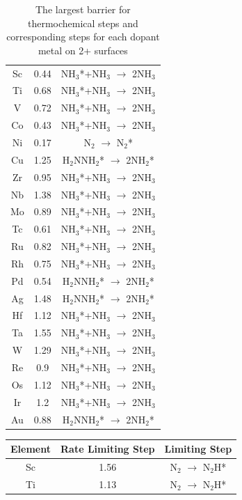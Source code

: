\documentclass[journal=jacsat,manuscript=article]{achemso}
\begin{document}
\begin{table}
\begin{center}
\begin{tabular}{| c | c |c |}
\hline
Sc & 0.44 & NH$_3$*+NH$_3$ $\rightarrow$ 2NH$_3$\\
Ti & 0.68 & NH$_3$*+NH$_3$ $\rightarrow$ 2NH$_3$\\
V & 0.72 & NH$_3$*+NH$_3$ $\rightarrow$ 2NH$_3$\\
Co & 0.43 & NH$_3$*+NH$_3$ $\rightarrow$ 2NH$_3$\\
Ni & 0.17 & N$_2$ $\rightarrow$ N$_2$*\\
Cu & 1.25 & H$_2$NNH$_2$* $\rightarrow$ 2NH$_2$*\\
Zr & 0.95 & NH$_3$*+NH$_3$ $\rightarrow$ 2NH$_3$\\
Nb & 1.38 & NH$_3$*+NH$_3$ $\rightarrow$ 2NH$_3$\\
Mo & 0.89 & NH$_3$*+NH$_3$ $\rightarrow$ 2NH$_3$\\
Tc & 0.61 & NH$_3$*+NH$_3$ $\rightarrow$ 2NH$_3$\\
Ru & 0.82 & NH$_3$*+NH$_3$ $\rightarrow$ 2NH$_3$\\
Rh & 0.75 & NH$_3$*+NH$_3$ $\rightarrow$ 2NH$_3$\\
Pd & 0.54 & H$_2$NNH$_2$* $\rightarrow$ 2NH$_2$*\\
Ag & 1.48 & H$_2$NNH$_2$* $\rightarrow$ 2NH$_2$*\\
Hf & 1.12 & NH$_3$*+NH$_3$ $\rightarrow$ 2NH$_3$\\
Ta & 1.55 & NH$_3$*+NH$_3$ $\rightarrow$ 2NH$_3$\\
W & 1.29 & NH$_3$*+NH$_3$ $\rightarrow$ 2NH$_3$\\
Re & 0.9 & NH$_3$*+NH$_3$ $\rightarrow$ 2NH$_3$\\
Os & 1.12 & NH$_3$*+NH$_3$ $\rightarrow$ 2NH$_3$\\
Ir & 1.2 & NH$_3$*+NH$_3$ $\rightarrow$ 2NH$_3$\\
Au & 0.88 & H$_2$NNH$_2$* $\rightarrow$ 2NH$_2$*\\
\hline
\end{tabular}
\end{center}
\caption{The largest barrier for thermochemical steps and corresponding steps for each dopant metal on 2+ surfaces}\label{table:thermo_limiting_steps}\end{table}\begin{table}
\begin{center}
\begin{tabular}{| c | c |c |}
\hline
Element & Rate Limiting Step & Limiting Step \\
\hline
Sc & 1.56 & N$_2$ $\rightarrow$ N$_2$H*\\
Ti & 1.13 & N$_2$ $\rightarrow$ N$_2$H*\\

\end{tabular}
\end{center}
\end{table}
\end{document}
